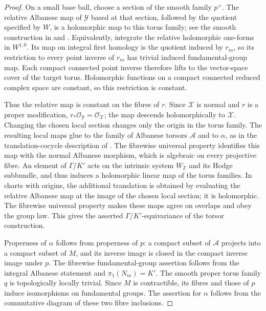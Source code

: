 \begin{proof}
On a small base ball, choose a section of the smooth family $p^+$. The relative Albanese map of $\mathcal{Y}$ based at that section, followed by the quotient specified by $W$, is a holomorphic map to this torus family; see the smooth construction in \cite[\S1.4]{Fujiki1983} and \cite[II, \S2(a) and Example~(2.15)]{Griffiths1968}.  Equivalently, integrate the relative holomorphic one-forms in $W^{1,0}$.  Its map on integral first homology is the quotient induced by $r_m$, so its restriction to every point inverse of $r_m$ has trivial induced fundamental-group map.  Each compact connected point inverse therefore lifts to the vector-space cover of the target torus.  Holomorphic functions on a compact connected reduced complex space are constant, so this restriction is constant.

Thus the relative map is constant on the fibres of $r$.  Since $\mathcal{X}$ is normal and $r$ is a proper modification, $r_*\mathcal{O}_{\mathcal{Y}}=\mathcal{O}_{\mathcal{X}}$; the map descends holomorphically to $\mathcal{X}$.  Changing the chosen local section changes only the origin in the torus family.  The resulting local maps glue to the family of Albanese torsors $\mathcal{A}$ and to $\alpha$, as in the translation-cocycle description of \cite[\S2.2, Proposition~2.1]{Claudon2018}.  The fibrewise universal property identifies this map with the normal Albanese morphism, which is algebraic on every projective fibre.  An element of $\Gamma/K'$ acts on the intrinsic system $W_{\mathbb{Z}}$ and its Hodge subbundle, and thus induces a holomorphic linear map of the torus families.  In charts with origins, the additional translation is obtained by evaluating the relative Albanese map at the image of the chosen local section; it is holomorphic.  The fibrewise universal property makes these maps agree on overlaps and obey the group law.  This gives the asserted $\Gamma/K'$-equivariance of the torsor construction.

Properness of $\alpha$ follows from properness of $p$: a compact subset of $\mathcal{A}$ projects into a compact subset of $M$, and its inverse image is closed in the compact inverse image under $p$. The fibrewise fundamental-group assertion follows from the integral Albanese statement and $\pi_1(N_m)=K'$.  The smooth proper torus family $q$ is topologically locally trivial.  Since $M$ is contractible, its fibres and those of $p$ induce isomorphisms on fundamental groups. The assertion for $\alpha$ follows from the commutative diagram of these two fibre inclusions.
\end{proof}

